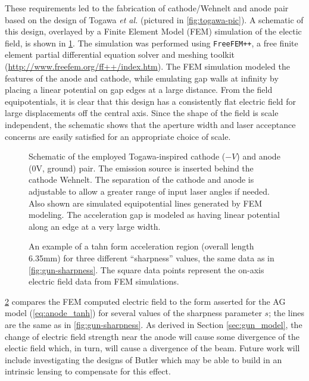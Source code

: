 These requirements led to the fabrication of cathode/Wehnelt and anode pair based on the design of Togawa \textit{et al.} \cite{togawa_ceb6_2007} (pictured in \ref{fig:togawa-pic}).
A schematic of this design, overlayed by a Finite Element Model (FEM) simulation of the electic field, is shown in \ref{fig:gun-field}.
The simulation was performed using \texttt{FreeFEM++}, a free finite element partial differential equation solver and meshing toolkit (\url{http://www.freefem.org/ff++/index.htm}).
The FEM simulation modeled the features of the anode and cathode, while emulating gap walls at infinity by placing a linear potential on gap edges at a large distance.
From the field equipotentials, it is clear that this design has a consistently flat electric field for large displacements off the central axis.
Since the shape of the field is scale independent, the schematic shows that the aperture width and laser acceptance concerns are easily satisfied for an appropriate choice of scale.

\begin{figure}
  \centering
  
  \caption[Schematic of the employed Togawa-inspired custom cathode-anode pair]{
    Schematic of the employed Togawa-inspired cathode ($-V$) and anode (0V, ground) pair.
    The emission source is inserted behind the cathode Wehnelt.
    The separation of the cathode and anode is adjustable to allow a greater range of input laser angles if needed. 
    Also shown are simulated equipotential lines generated by FEM modeling.
    The acceleration gap is modeled as having linear potential along an edge at a very large width. 
  }
  \label{fig:gun-field}
\end{figure}

\begin{figure}
  \centering

  \begin{tikzpicture}
    
  \end{tikzpicture}

  \caption[An example of a tanh form acceleration region for three different ``sharpness'' values]{
    An example of a tahn form acceleration region (overall length 6.35mm) for three different ``sharpness'' values, the same data as in \ref{fig:gun-sharpness}.
    The square data points represent the on-axis electric field data from FEM simulations.
  }
  \label{fig:field_on_axis_fem}
\end{figure}

\ref{fig:field_on_axis_fem} compares the FEM computed electric field to the form asserted for the AG model (\ref{eq:anode_tanh}) for several values of the sharpness parameter $s$; the lines are the same as in \ref{fig:gun-sharpness}.
As derived in Section \ref{sec:gun_model}, the change of electric field strength near the anode will cause some divergence of the electic field which, in turn, will cause a divergence of the beam.
Future work will include investigating the designs of Butler %
which may be able to build in an intrinsic lensing to compensate for this effect.

